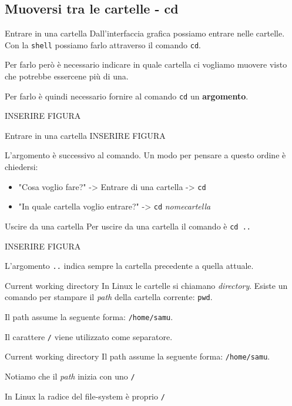 \documentclass{beamer}
\begin{document}
\subsection{Muoversi tra le cartelle - cd}
\begin{frame}{Entrare in una cartella}
  Dall'interfaccia grafica possiamo entrare nelle cartelle. Con la \texttt{shell}
  possiamo farlo attraverso il comando \texttt{cd}.\bigskip

  Per farlo però è necessario indicare in quale cartella ci vogliamo muovere 
  visto che potrebbe essercene più di una.\bigskip

  Per farlo è quindi necessario fornire al comando \texttt{cd} un 
  \textbf{argomento}.\bigskip

  INSERIRE FIGURA\bigskip
\end{frame}

\begin{frame}{Entrare in una cartella}
  INSERIRE FIGURA\bigskip

  L'argomento è successivo al comando. Un modo per pensare a questo ordine è
  chiedersi:\medskip
  
  \begin{itemize}
    \item "Cosa voglio fare?" -> Entrare di una cartella -> \texttt{cd}
    \item "In quale cartella voglio entrare?" -> \texttt{cd} 
      \textit{nomecartella}
  \end{itemize}
\end{frame}

\begin{frame}{Uscire da una cartella}
  Per uscire da una cartella il comando è \texttt{cd ..}\bigskip

  INSERIRE FIGURA\bigskip

  L'argomento \texttt{..} indica sempre la cartella precedente a quella attuale.
\end{frame}

\begin{frame}{Current working directory}
  In Linux le cartelle si chiamano \textit{directory}. Esiste un comando per
  stampare il \textit{path} della cartella corrente: \texttt{pwd}.\bigskip

  Il path assume la seguente forma: \texttt{/home/samu}.\bigskip
  
  Il carattere \texttt{/} viene utilizzato come separatore.
\end{frame}

\begin{frame}{Current working directory}
  Il path assume la seguente forma: \texttt{/home/samu}.\bigskip

  Notiamo che il \textit{path} inizia con uno \texttt{/}\bigskip

  In Linux la radice del file-system è proprio \texttt{/}
\end{frame}
\end{document}
